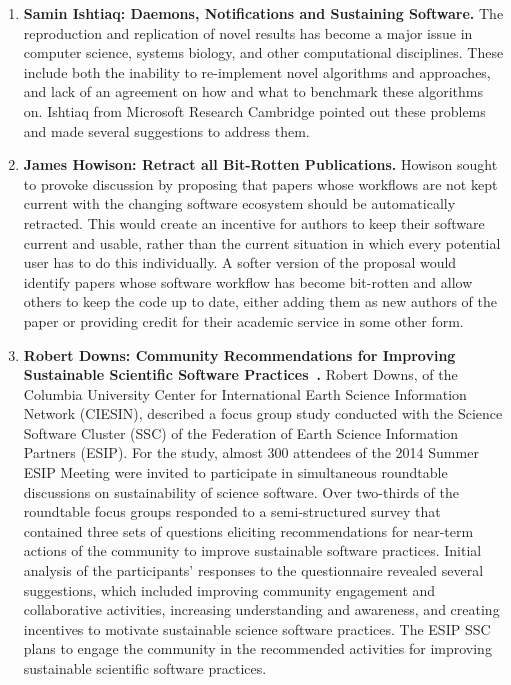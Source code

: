 \documentclass[11pt, oneside]{amsart}
\begin{document}
\begin{enumerate}
\item \textbf{Samin Ishtiaq: Daemons, Notifications and Sustaining Software. }%
The reproduction and replication of novel results has become a major issue in
computer science, systems biology, and other computational disciplines. These
include both the inability to re-implement novel algorithms and approaches, and
lack of an agreement on how and what to benchmark these algorithms on. Ishtiaq
from Microsoft Research Cambridge pointed out these problems and made several
suggestions to address them.

\item \textbf{James Howison: Retract all Bit-Rotten Publications. }%
Howison sought to provoke discussion by proposing that papers whose workflows
are not kept current with the changing software ecosystem should be
automatically retracted. This would create an incentive for authors to keep
their software current and usable, rather than the current situation in which
every potential user has to do this individually. A softer version of the
proposal would identify papers whose software workflow has become bit-rotten and
allow others to keep the code up to date, either adding them as new authors of
the paper or providing credit for their academic service in some other form.




\item \textbf{Robert Downs: Community Recommendations for Improving Sustainable
Scientific Software Practices~\cite{Downs_poster}.} Robert Downs, of the
Columbia University Center for International Earth Science Information Network
(CIESIN), described a focus group study conducted with the Science Software
Cluster (SSC) of the Federation of Earth Science Information Partners (ESIP).
For the study, almost 300 attendees of the 2014 Summer ESIP Meeting were invited
to participate in simultaneous roundtable discussions on sustainability of
science software. Over two-thirds of the roundtable focus groups responded to a
semi-structured survey that contained three sets of questions eliciting
recommendations for near-term actions of the community to improve sustainable
software practices. Initial analysis of the participants' responses to the
questionnaire revealed several suggestions, which included improving community
engagement and collaborative activities, increasing understanding and awareness,
and creating incentives to motivate sustainable science software practices. 
The ESIP SSC plans to engage the community in the recommended activities for
improving sustainable scientific software practices.


\end{enumerate}
\end{document}
